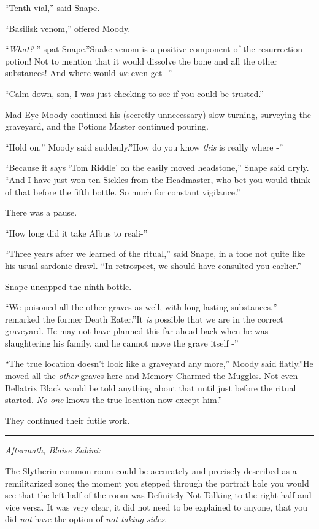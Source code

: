 ``Tenth vial,'' said Snape.

``Basilisk venom,'' offered Moody.

``\emph{What?} '' spat Snape.''Snake venom is a positive component of the
resurrection potion! Not to mention that it would dissolve the bone and
all the other substances! And where would \emph{we} even get -''

``Calm down, son, I was just checking to see if you could be trusted.''

Mad-Eye Moody continued his (secretly unnecessary) slow turning,
surveying the graveyard, and the Potions Master continued pouring.

``Hold on,'' Moody said suddenly.''How do you know \emph{this} is really
where -''

``Because it says `Tom Riddle' on the easily moved headstone,'' Snape
said dryly. ``And I have just won ten Sickles from the Headmaster, who
bet you would think of that before the fifth bottle. So much for
constant vigilance.''

There was a pause.

``How long did it take Albus to reali-''

``Three years after we learned of the ritual,'' said Snape, in a tone
not quite like his usual sardonic drawl. ``In retrospect, we should have
consulted you earlier.''

Snape uncapped the ninth bottle.

``We poisoned all the other graves as well, with long-lasting
substances,'' remarked the former Death Eater.''It \emph{is} possible
that we are in the correct graveyard. He may not have planned this far
ahead back when he was slaughtering his family, and he cannot move the
grave itself -''

``The true location doesn't look like a graveyard any more,'' Moody said
flatly.''He moved all the \emph{other} graves here and Memory-Charmed
the Muggles. Not even Bellatrix Black would be told anything about that
until just before the ritual started. \emph{No one} knows the true
location now except him.''

They continued their futile work.

\begin{center}\rule{3in}{0.4pt}\end{center}

\emph{Aftermath, Blaise Zabini:}

The Slytherin common room could be accurately and precisely described as
a remilitarized zone; the moment you stepped through the portrait hole
you would see that the left half of the room was Definitely Not Talking
to the right half and vice versa. It was very clear, it did not need to
be explained to anyone, that you did \emph{not} have the option of
\emph{not taking sides}.

